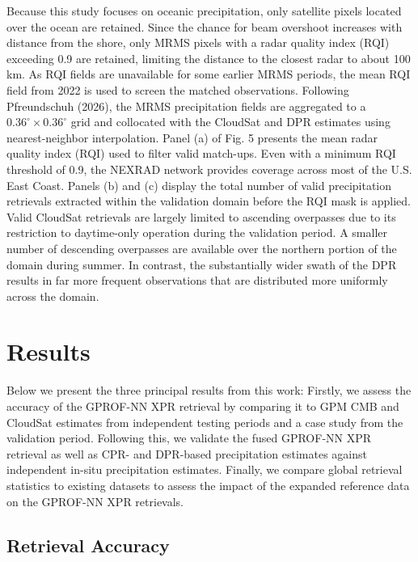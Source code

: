 \documentclass{ametsocV6.1}
\begin{document}
Because this study focuses on oceanic precipitation, only satellite pixels
located over the ocean are retained. Since the chance for beam overshoot
increases with distance from the shore, only MRMS pixels with a radar quality
index (RQI) exceeding 0.9 are retained, limiting the distance to the closest
radar to about 100 km. As RQI fields are unavailable for some earlier MRMS
periods, the mean RQI field from 2022 is used to screen the matched
observations. Following Pfreundschuh (2026), the MRMS precipitation fields are
aggregated to a $0.36^\circ \times 0.36^\circ$ grid and collocated with the CloudSat and
DPR estimates using nearest-neighbor interpolation. Panel (a) of Fig. 5 presents
the mean radar quality index (RQI) used to filter valid match-ups. Even with a
minimum RQI threshold of 0.9, the NEXRAD network provides coverage across most
of the U.S. East Coast. Panels (b) and (c) display the total number of valid
precipitation retrievals extracted within the validation domain before the RQI
mask is applied. Valid CloudSat retrievals are largely limited to ascending
overpasses due to its restriction to daytime-only operation during the
validation period. A smaller number of descending overpasses are available over
the northern portion of the domain during summer. In contrast, the substantially
wider swath of the DPR results in far more frequent observations that are
distributed more uniformly across the domain.


\section{Results}
\label{sec:results}

Below we present the three principal results from this work: Firstly, we assess
the accuracy of the GPROF-NN XPR retrieval by comparing it to GPM CMB and
CloudSat estimates from independent testing periods and a case study from the
validation period. Following this, we validate the fused GPROF-NN XPR retrieval
as well as CPR- and DPR-based precipitation estimates against independent
in-situ precipitation estimates. Finally, we compare global retrieval statistics
to existing datasets to assess the impact of the expanded reference data on the
GPROF-NN XPR retrievals.

\subsection*{Retrieval Accuracy}
\end{document}

